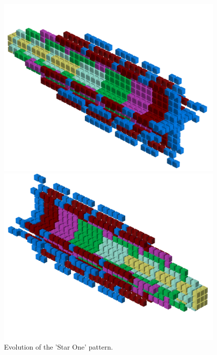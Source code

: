 \clearpage
\begin{figure}[H]
    \centering
    \begin{adjustbox}{width=12cm,center}
      \includegraphics[width=12cm]{src/patterns/pattern0-45.png}%
    \end{adjustbox}
    \begin{adjustbox}{width=12cm,margin=0cm -2cm}
      \includegraphics[width=12cm]{src/patterns/pattern0-225.png}%
    \end{adjustbox}
\caption{Evolution of the 'Star One' pattern.}
\end{figure}

